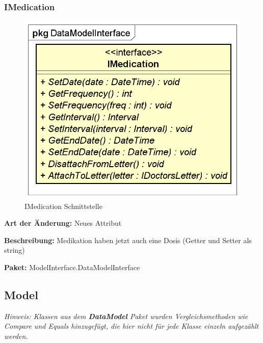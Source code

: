 \documentclass[a4paper]{scrreprt}
\begin{document}
\subsubsection{IMedication}
\begin{figure}[H]
\centering
\includegraphics[width=0.45\textheight]{graphics/Klassendiagramme/Model/IMedication.png}
\caption{IMedication Schnittstelle}
\end{figure}
\textbf{Art der Änderung:} Neues Attribut

\textbf{Beschreibung:} Medikation haben jetzt auch eine Dosis (Getter und Setter als string)

\textbf{Paket:} ModelInterface.DataModelInterface

\subsection{Model}
\textit{Hinweis: Klassen aus dem \textbf{DataModel} Paket wurden Vergleichsmethoden wie Compare und Equals hinzugefügt, die hier nicht für jede Klasse einzeln aufgezählt werden.}
\end{document}
